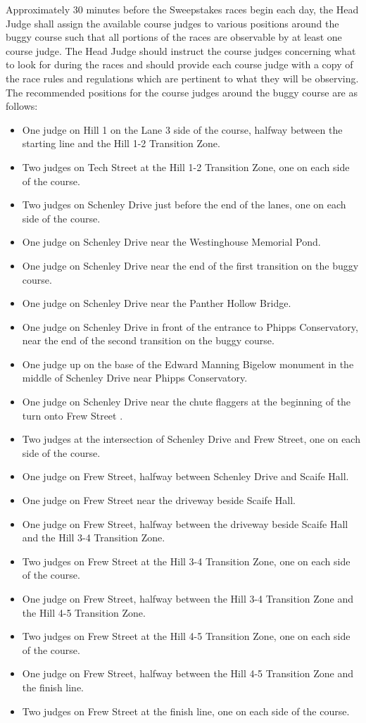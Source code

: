 Approximately 30 minutes before the Sweepstakes races begin each day, the Head Judge shall assign the available course judges to various positions around the buggy course such that all portions of the races are observable by at least one course judge. The Head Judge should instruct the course judges concerning what to look for during the races and should provide each course judge with a copy of the race rules and regulations which are pertinent to what they will be observing. The recommended positions for the course judges around the buggy course are as follows:
\begin{itemize}
	\item One judge on Hill 1 on the Lane 3 side of the course, halfway between the starting line and the Hill 1-2 Transition Zone.
	\item Two judges on Tech Street at the Hill 1-2 Transition Zone, one on each side of the course.
	\item Two judges on Schenley Drive just before the end of the lanes, one on each side of the course.
	\item One judge on Schenley Drive near the Westinghouse Memorial Pond.
	\item One judge on Schenley Drive near the end of the first transition on the buggy course.
	\item One judge on Schenley Drive near the Panther Hollow Bridge.
	\item One judge on Schenley Drive in front of the entrance to Phipps Conservatory, near the end of the second transition on the buggy course.
	\item One judge up on the base of the Edward Manning Bigelow monument in the middle of Schenley Drive near Phipps Conservatory.
	\item One judge on Schenley Drive near the chute flaggers at the beginning of the turn onto Frew Street .
	\item Two judges at the intersection of Schenley Drive and Frew Street, one on each side of the course.
	\item One judge on Frew Street, halfway between Schenley Drive and Scaife Hall.
	\item One judge on Frew Street near the driveway beside Scaife Hall.
	\item One judge on Frew Street, halfway between the driveway beside Scaife Hall and the Hill 3-4 Transition Zone.
	\item Two judges on Frew Street at the Hill 3-4 Transition Zone, one on each side of the course.
	\item One judge on Frew Street, halfway between the Hill 3-4 Transition Zone and the Hill 4-5 Transition Zone.
	\item Two judges on Frew Street at the Hill 4-5 Transition Zone, one on each side of the course.
	\item One judge on Frew Street, halfway between the Hill 4-5 Transition Zone and the finish line.
	\item Two judges on Frew Street at the finish line, one on each side of the course.
\end{itemize}

